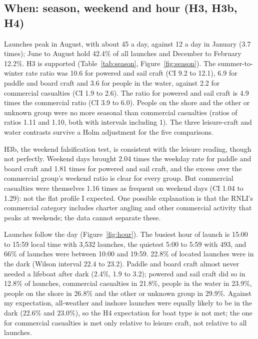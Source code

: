\documentclass[11pt,a4paper]{article}
\begin{document}
\subsection{When: season, weekend and hour (H3, H3b, H4)}
Launches peak in August, with about 45 a day, against 12 a day in January (3.7 times); June to August hold 42.4\% of all launches and December to February 12.2\%. H3 is supported (Table~\ref{tab:season}, Figure~\ref{fig:season}). The summer-to-winter rate ratio was 10.6 for powered and sail craft (CI 9.2 to 12.1), 6.9 for paddle and board craft and 3.6 for people in the water, against 2.2 for commercial casualties (CI 1.9 to 2.6). The ratio for powered and sail craft is 4.9 times the commercial ratio (CI 3.9 to 6.0). People on the shore and the other or unknown group were no more seasonal than commercial casualties (ratios of ratios 1.11 and 1.10, both with intervals including 1). The three leisure-craft and water contrasts survive a Holm adjustment for the five comparisons.

H3b, the weekend falsification test, is consistent with the leisure reading, though not perfectly. Weekend days brought 2.04 times the weekday rate for paddle and board craft and 1.81 times for powered and sail craft, and the excess over the commercial group's weekend ratio is clear for every group. But commercial casualties were themselves 1.16 times as frequent on weekend days (CI 1.04 to 1.29): not the flat profile I expected. One possible explanation is that the RNLI's commercial category includes charter angling and other commercial activity that peaks at weekends; the data cannot separate these.

Launches follow the day (Figure~\ref{fig:hour}). The busiest hour of launch is 15:00 to 15:59 local time with 3,532 launches, the quietest 5:00 to 5:59 with 493, and 66\% of launches were between 10:00 and 19:59. 22.8\% of located launches were in the dark (Wilson interval 22.4 to 23.2). Paddle and board craft almost never needed a lifeboat after dark (2.4\%, 1.9 to 3.2); powered and sail craft did so in 12.8\% of launches, commercial casualties in 21.8\%, people in the water in 23.9\%, people on the shore in 26.8\% and the other or unknown group in 29.9\%. Against my expectation, all-weather and inshore launches were equally likely to be in the dark (22.6\% and 23.0\%), so the H4 expectation for boat type is not met; the one for commercial casualties is met only relative to leisure craft, not relative to all launches.
\end{document}
